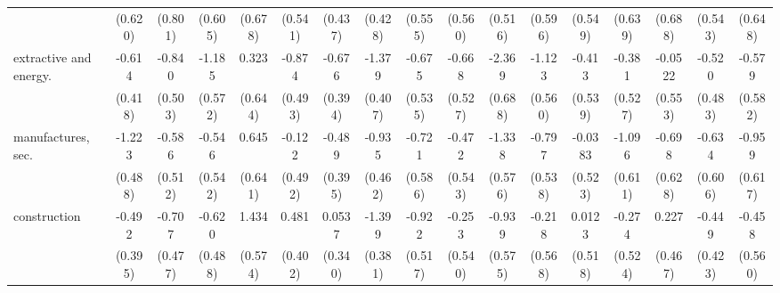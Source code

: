 {\begin{tabular}{l*{16}{c}}
                    &     (0.620)         &     (0.801)         &     (0.605)         &     (0.678)         &     (0.541)         &     (0.437)         &     (0.428)         &     (0.555)         &     (0.560)         &     (0.516)         &     (0.596)         &     (0.549)         &     (0.639)         &     (0.688)         &     (0.543)         &     (0.648)         \\
[1em]
extractive and energy.&      -0.614         &      -0.840         &      -1.185\sym{*}  &       0.323         &      -0.874         &      -0.676         &      -1.379\sym{***}&      -0.675         &      -0.668         &      -2.369\sym{***}&      -1.123\sym{*}  &      -0.413         &      -0.381         &     -0.0522         &      -0.520         &      -0.579         \\
                    &     (0.418)         &     (0.503)         &     (0.572)         &     (0.644)         &     (0.493)         &     (0.394)         &     (0.407)         &     (0.535)         &     (0.527)         &     (0.688)         &     (0.560)         &     (0.539)         &     (0.527)         &     (0.553)         &     (0.483)         &     (0.582)         \\
[1em]
manufactures, sec.  &      -1.223\sym{*}  &      -0.586         &      -0.546         &       0.645         &      -0.122         &      -0.489         &      -0.935\sym{*}  &      -0.721         &      -0.472         &      -1.338\sym{*}  &      -0.797         &     -0.0383         &      -1.096         &      -0.698         &      -0.634         &      -0.959         \\
                    &     (0.488)         &     (0.512)         &     (0.542)         &     (0.641)         &     (0.492)         &     (0.395)         &     (0.462)         &     (0.586)         &     (0.543)         &     (0.576)         &     (0.538)         &     (0.523)         &     (0.611)         &     (0.628)         &     (0.606)         &     (0.617)         \\
[1em]
construction        &      -0.492         &      -0.707         &      -0.620         &       1.434\sym{*}  &       0.481         &      0.0537         &      -1.399\sym{***}&      -0.922         &      -0.253         &      -0.939         &      -0.218         &      0.0123         &      -0.274         &       0.227         &      -0.449         &      -0.458         \\
                    &     (0.395)         &     (0.477)         &     (0.488)         &     (0.574)         &     (0.402)         &     (0.340)         &     (0.381)         &     (0.517)         &     (0.540)         &     (0.575)         &     (0.568)         &     (0.518)         &     (0.524)         &     (0.467)         &     (0.423)         &     (0.560)         \\

\end{tabular}}
